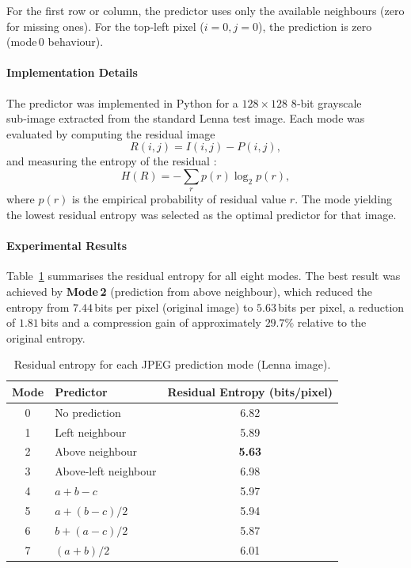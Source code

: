 For the first row or column, the predictor uses only the available neighbours (zero for missing ones). For the top‑left pixel (\(i=0,j=0\)), the prediction is zero (mode 0 behaviour).

\paragraph{Implementation Details}
The predictor was implemented in Python for a \(128\times128\) 8‑bit grayscale sub‑image extracted from the standard Lenna test image. Each mode was evaluated by computing the residual image
\[
R(i,j) = I(i,j) - P(i,j),
\] 
and measuring the entropy of the residual \cite{Salomon1997}:
\[
H(R) = -\sum_{r} p(r) \log_2 p(r),
\]
where \(p(r)\) is the empirical probability of residual value \(r\). The mode yielding the lowest residual entropy was selected as the optimal predictor for that image.

\paragraph{Experimental Results}
Table~\ref{tab:jpeg_results} summarises the residual entropy for all eight modes. The best result was achieved by \textbf{Mode 2} (prediction from above neighbour), which reduced the entropy from \(7.44\) bits per pixel (original image) to \(5.63\) bits per pixel, a reduction of \(1.81\) bits and a compression gain of approximately \(29.7\%\) relative to the original entropy.

\begin{table}[H]
\centering
\caption{Residual entropy for each JPEG prediction mode (Lenna image).}
\label{tab:jpeg_results}
\begin{tabular}{|c|l|c|}
\hline
\textbf{Mode} & \textbf{Predictor} & \textbf{Residual Entropy (bits/pixel)} \\
\hline
0 & No prediction & 6.82 \\
1 & Left neighbour & 5.89 \\
2 & Above neighbour & \textbf{5.63} \\
3 & Above‑left neighbour & 6.98 \\
4 & \(a+b-c\) & 5.97 \\
5 & \(a + (b-c)/2\) & 5.94 \\
6 & \(b + (a-c)/2\) & 5.87 \\
7 & \((a+b)/2\) & 6.01 \\
\hline
\end{tabular}
\end{table}

